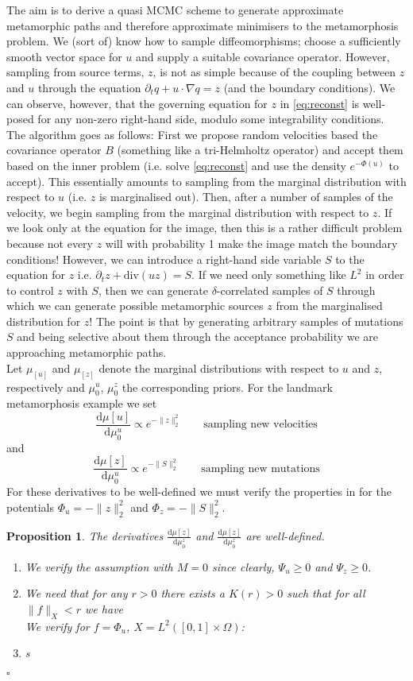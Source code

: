 \documentclass{article}
\newtheorem{proposition}{Proposition}
\newcommand{\dd}[2]{\frac{\diff#1}{\diff#2}}
\newcommand{\norm}[2]{\| #1 \|_{ #2 }}
\newcommand{\ltwonorm}[1]{\norm{ #1 }{2}}
\newcommand{\diff}[1]{\text{d} #1}
\begin{document}
The aim is to derive a quasi MCMC scheme to generate approximate metamorphic
paths and therefore
approximate minimisers to the metamorphosis problem. We (sort of) know how to
sample diffeomorphisms; choose a sufficiently smooth vector space for $u$ and
supply a suitable covariance operator. However, sampling from source terms, $z$,
is not as simple because of the coupling between $z$ and $u$ through the
equation $\partial_t q + u\cdot\nabla q = z$ (and the boundary conditions).  We
can observe, however, that the governing equation for $z$ in \eqref{eq:reconst}
is well-posed for any non-zero right-hand side, modulo some integrability
conditions. The algorithm goes as follows: First we propose random velocities
based the covariance operator $B$ (something like a tri-Helmholtz operator) and
accept them based on the inner problem (i.e.  solve \eqref{eq:reconst} and use
the density $e^{-\Phi(u)}$ to accept). This essentially amounts to sampling from
the marginal distribution with respect to $u$ (i.e. $z$ is marginalised out).
Then, after a number of samples of the velocity, we begin sampling from the
marginal distribution with respect to $z$. If we look only at the equation for
the image, then this is a rather difficult problem because not every $z$ will
with probability 1 make the image match the boundary conditions! However, we
can introduce a right-hand side variable $S$ to the equation for $z$ i.e.
$\partial_t z + \text{div}(u z) = S$. If we need only something like $L^2$ in
order to control $z$ with $S$, then we can generate $\delta$-correlated samples
of $S$ through which we can generate possible metamorphic sources $z$ from the
marginalised distribution for $z$! The point is that by generating arbitrary
samples of mutations $S$ and being selective about them through the acceptance
probability we are approaching metamorphic paths.\\

Let $\mu_[u]$ and $\mu_[z]$ denote the marginal distributions with respect to
$u$ and $z$, respectively and $\mu_0^u$, $\mu_0^z$ the corresponding priors.
For the landmark metamorphosis example we set
\[
\dd{\mu[u]}{\mu_0^u} \propto e^{-\ltwonorm{z}^2} \qquad\text{sampling new velocities}
\]
and
\[
\dd{\mu[z]}{\mu_0^u} \propto e^{-\ltwonorm{S}^2} \qquad\text{sampling new mutations}
\]
For these derivatives to be well-defined we must verify the properties in
\cite[Assumption 2.1]{dashti2013map} for the potentials $\Phi_u =-\ltwonorm{z}^2$
and $\Phi_z =-\ltwonorm{S}^2$.

\begin{proposition}
The derivatives $\dd{\mu[z]}{\mu_0^z}$ and $\dd{\mu[z]}{\mu_0^z}$ are
well-defined.
\begin{enumerate}
\item We verify the assumption with $M=0$ since clearly, $\Psi_u \geq 0$ and
$\Psi_z \geq 0$.
\item We need that for any $r>0$ there exists a $K(r)>0$ such that for all
$\norm{f}{X} < r$ we have
\[
\]
We verify for $f=\Phi_u$, $X=L^2([0,1]\times\Omega)$:
\item s
\end{enumerate}
{\hfill $\square$}
\end{proposition}
\end{document}
